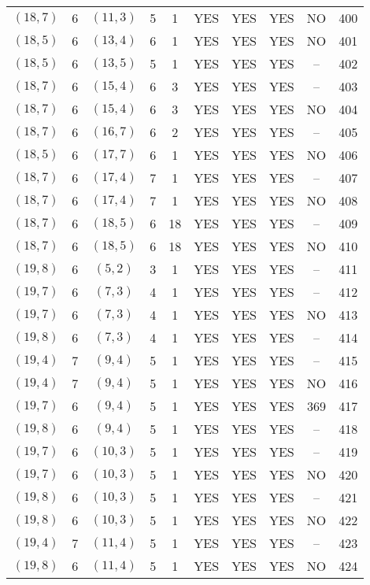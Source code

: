 \begin{longtable}{|c|c|c|c|c|c|c|c|c|c|}
$(18, 7)$ & 6 & $(11, 3)$ & 5 & 1 & YES & YES & YES & NO & 400\\
$(18, 5)$ & 6 & $(13, 4)$ & 6 & 1 & YES & YES & YES & NO & 401\\
$(18, 5)$ & 6 & $(13, 5)$ & 5 & 1 & YES & YES & YES & -- & 402\\
$(18, 7)$ & 6 & $(15, 4)$ & 6 & 3 & YES & YES & YES & -- & 403\\
$(18, 7)$ & 6 & $(15, 4)$ & 6 & 3 & YES & YES & YES & NO & 404\\
$(18, 7)$ & 6 & $(16, 7)$ & 6 & 2 & YES & YES & YES & -- & 405\\
$(18, 5)$ & 6 & $(17, 7)$ & 6 & 1 & YES & YES & YES & NO & 406\\
$(18, 7)$ & 6 & $(17, 4)$ & 7 & 1 & YES & YES & YES & -- & 407\\
$(18, 7)$ & 6 & $(17, 4)$ & 7 & 1 & YES & YES & YES & NO & 408\\
$(18, 7)$ & 6 & $(18, 5)$ & 6 & 18 & YES & YES & YES & -- & 409\\
$(18, 7)$ & 6 & $(18, 5)$ & 6 & 18 & YES & YES & YES & NO & 410\\
$(19, 8)$ & 6 & $(5, 2)$ & 3 & 1 & YES & YES & YES & -- & 411\\
$(19, 7)$ & 6 & $(7, 3)$ & 4 & 1 & YES & YES & YES & -- & 412\\
$(19, 7)$ & 6 & $(7, 3)$ & 4 & 1 & YES & YES & YES & NO & 413\\
$(19, 8)$ & 6 & $(7, 3)$ & 4 & 1 & YES & YES & YES & -- & 414\\
$(19, 4)$ & 7 & $(9, 4)$ & 5 & 1 & YES & YES & YES & -- & 415\\
$(19, 4)$ & 7 & $(9, 4)$ & 5 & 1 & YES & YES & YES & NO & 416\\
$(19, 7)$ & 6 & $(9, 4)$ & 5 & 1 & YES & YES & YES & 369 & 417\\
$(19, 8)$ & 6 & $(9, 4)$ & 5 & 1 & YES & YES & YES & -- & 418\\
$(19, 7)$ & 6 & $(10, 3)$ & 5 & 1 & YES & YES & YES & -- & 419\\
$(19, 7)$ & 6 & $(10, 3)$ & 5 & 1 & YES & YES & YES & NO & 420\\
$(19, 8)$ & 6 & $(10, 3)$ & 5 & 1 & YES & YES & YES & -- & 421\\
$(19, 8)$ & 6 & $(10, 3)$ & 5 & 1 & YES & YES & YES & NO & 422\\
$(19, 4)$ & 7 & $(11, 4)$ & 5 & 1 & YES & YES & YES & -- & 423\\
$(19, 8)$ & 6 & $(11, 4)$ & 5 & 1 & YES & YES & YES & NO & 424\\

\end{longtable}
